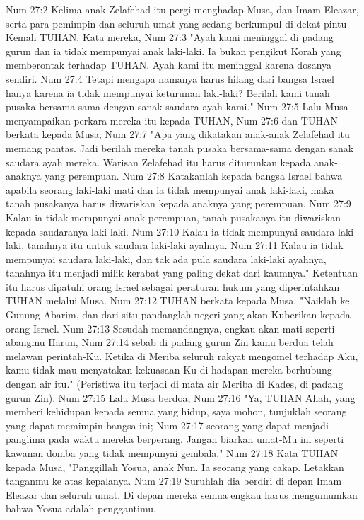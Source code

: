 Num 27:2  Kelima anak Zelafehad itu pergi menghadap Musa, dan Imam Eleazar, serta para pemimpin dan seluruh umat yang sedang berkumpul di dekat pintu Kemah TUHAN. Kata mereka,
Num 27:3  "Ayah kami meninggal di padang gurun dan ia tidak mempunyai anak laki-laki. Ia bukan pengikut Korah yang memberontak terhadap TUHAN. Ayah kami itu meninggal karena dosanya sendiri.
Num 27:4  Tetapi mengapa namanya harus hilang dari bangsa Israel hanya karena ia tidak mempunyai keturunan laki-laki? Berilah kami tanah pusaka bersama-sama dengan sanak saudara ayah kami."
Num 27:5  Lalu Musa menyampaikan perkara mereka itu kepada TUHAN,
Num 27:6  dan TUHAN berkata kepada Musa,
Num 27:7  "Apa yang dikatakan anak-anak Zelafehad itu memang pantas. Jadi berilah mereka tanah pusaka bersama-sama dengan sanak saudara ayah mereka. Warisan Zelafehad itu harus diturunkan kepada anak-anaknya yang perempuan.
Num 27:8  Katakanlah kepada bangsa Israel bahwa apabila seorang laki-laki mati dan ia tidak mempunyai anak laki-laki, maka tanah pusakanya harus diwariskan kepada anaknya yang perempuan.
Num 27:9  Kalau ia tidak mempunyai anak perempuan, tanah pusakanya itu diwariskan kepada saudaranya laki-laki.
Num 27:10  Kalau ia tidak mempunyai saudara laki-laki, tanahnya itu untuk saudara laki-laki ayahnya.
Num 27:11  Kalau ia tidak mempunyai saudara laki-laki, dan tak ada pula saudara laki-laki ayahnya, tanahnya itu menjadi milik kerabat yang paling dekat dari kaumnya." Ketentuan itu harus dipatuhi orang Israel sebagai peraturan hukum yang diperintahkan TUHAN melalui Musa.
Num 27:12  TUHAN berkata kepada Musa, "Naiklah ke Gunung Abarim, dan dari situ pandanglah negeri yang akan Kuberikan kepada orang Israel.
Num 27:13  Sesudah memandangnya, engkau akan mati seperti abangmu Harun,
Num 27:14  sebab di padang gurun Zin kamu berdua telah melawan perintah-Ku. Ketika di Meriba seluruh rakyat mengomel terhadap Aku, kamu tidak mau menyatakan kekuasaan-Ku di hadapan mereka berhubung dengan air itu." (Peristiwa itu terjadi di mata air Meriba di Kades, di padang gurun Zin).
Num 27:15  Lalu Musa berdoa,
Num 27:16  "Ya, TUHAN Allah, yang memberi kehidupan kepada semua yang hidup, saya mohon, tunjuklah seorang yang dapat memimpin bangsa ini;
Num 27:17  seorang yang dapat menjadi panglima pada waktu mereka berperang. Jangan biarkan umat-Mu ini seperti kawanan domba yang tidak mempunyai gembala."
Num 27:18  Kata TUHAN kepada Musa, "Panggillah Yosua, anak Nun. Ia seorang yang cakap. Letakkan tanganmu ke atas kepalanya.
Num 27:19  Suruhlah dia berdiri di depan Imam Eleazar dan seluruh umat. Di depan mereka semua engkau harus mengumumkan bahwa Yosua adalah penggantimu.
